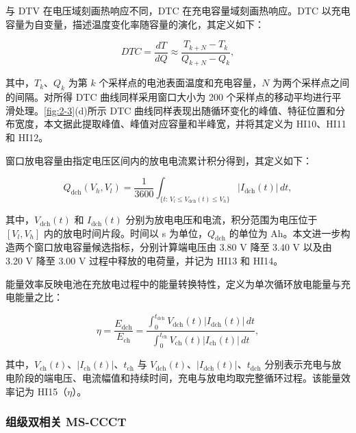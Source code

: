 与 DTV 在电压域刻画热响应不同，DTC 在充电容量域刻画热响应。DTC 以充电容量为自变量，描述温度变化率随容量的演化，其定义如下\cite{ref64}：

\begin{equation}
DTC=\frac{dT}{dQ}\approx\frac{T_{k+N}-T_k}{Q_{k+N}-Q_k},
\end{equation}

其中，$T_k$、$Q_k$ 为第 $k$ 个采样点的电池表面温度和充电容量，$N$ 为两个采样点之间的间隔。对所得 DTC 曲线同样采用窗口大小为 200 个采样点的移动平均进行平滑处理\cite{ref64}。\cref{fig:2-3}(d)所示 DTC 曲线同样表现出随循环变化的峰值、特征位置和分布宽度，本文据此提取峰值、峰值对应容量和半峰宽，并将其定义为 HI10、HI11 和 HI12。

窗口放电容量由指定电压区间内的放电电流累计积分得到，其定义如下：

\begin{equation}
Q_{\mathrm{dch}}(V_h,V_l)=\frac{1}{3600}\int_{\{t:\,V_l\leq V_{\mathrm{dch}}(t)\leq V_h\}}\left|I_{\mathrm{dch}}(t)\right|\,dt,
\end{equation}

其中，$V_{\mathrm{dch}}(t)$ 和 $I_{\mathrm{dch}}(t)$ 分别为放电电压和电流，积分范围为电压位于 $[V_l,V_h]$ 内的放电时间片段。时间以 s 为单位，$Q_{\mathrm{dch}}$ 的单位为 Ah。本文进一步构造两个窗口放电容量候选指标，分别计算端电压由 3.80 V 降至 3.40 V 以及由 3.20 V 降至 3.00 V 过程中释放的电荷量，并记为 HI13 和 HI14\cite{ref31,ref52}。

能量效率反映电池在充放电过程中的能量转换特性，定义为单次循环放电能量与充电能量之比\cite{ref66}：

\begin{equation}
\eta=\frac{E_{\mathrm{dch}}}{E_{\mathrm{ch}}}=\frac{\int_0^{t_{\mathrm{dch}}}V_{\mathrm{dch}}(t)\left|I_{\mathrm{dch}}(t)\right|\,dt}{\int_0^{t_{\mathrm{ch}}}V_{\mathrm{ch}}(t)\left|I_{\mathrm{ch}}(t)\right|\,dt},
\end{equation}

其中，$V_{\mathrm{ch}}(t)$、$|I_{\mathrm{ch}}(t)|$、$t_{\mathrm{ch}}$ 与 $V_{\mathrm{dch}}(t)$、$|I_{\mathrm{dch}}(t)|$、$t_{\mathrm{dch}}$ 分别表示充电与放电阶段的端电压、电流幅值和持续时间，充电与放电均取完整循环过程。该能量效率记为 HI15（$\eta$）。




\subsubsection{组级双相关 MS-CCCT}
\label{sec:ms-ccct}

